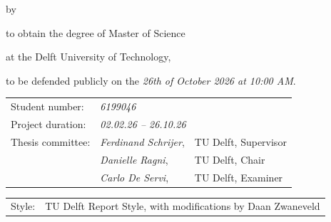 \begin{titlepage}

\begin{center}

{\makeatletter
\largetitlestyle\fontsize{45}{45}\selectfont\@title
\makeatother}

{\makeatletter
\ifdefvoid{\@subtitle}{}{\bigskip\titlestyle\fontsize{20}{20}\selectfont\@subtitle}
\makeatother}

\bigskip
\bigskip

by

\bigskip
\bigskip

{\makeatletter
\largetitlestyle\fontsize{25}{25}\selectfont\@author
\makeatother}

\bigskip
\bigskip

to obtain the degree of Master of Science

at the Delft University of Technology,

to be defended publicly on the \emph{26th of October 2026 at 10:00 AM}.

\vfill

\begin{tabular}{lll}
    Student number: & \emph{6199046} \\
    Project duration: & \multicolumn{2}{l}{\emph{02.02.26 -- 26.10.26}} \\
    Thesis committee: & \emph{Ferdinand Schrijer}, & TU Delft, Supervisor \\
        & \emph{Danielle Ragni}, & TU Delft, Chair\\
        & \emph{Carlo De Servi}, & TU Delft, Examiner
\end{tabular}


\bigskip
\bigskip
\begin{tabular}{p{15mm}p{10cm}}
    Style: & TU Delft Report Style, with modifications by Daan Zwaneveld
\end{tabular}


\end{center}
\end{titlepage}
